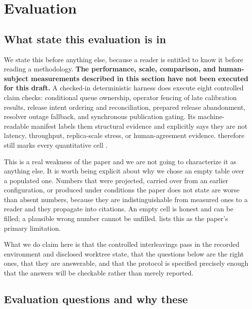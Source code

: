 \section{Evaluation}
\label{sec:eval}



\subsection{What state this evaluation is in}

We state this before anything else, because a reader is entitled to know it before
reading a methodology. \textbf{The performance, scale, comparison, and human-subject
measurements described in this section have not been executed for this draft.}
A checked-in deterministic harness does execute eight controlled claim checks:
conditional queue ownership, operator fencing of late calibration results, release
intent ordering and reconciliation, prepared release abandonment, resolver outage
fallback, and synchronous publication gating.
Its machine-readable manifest labels them structural evidence and explicitly says
they are not latency, throughput, replica-scale stress, or human-agreement evidence.
 therefore still marks every quantitative cell \pending{}.

This is a real weakness of the paper and we are not going to characterize it as
anything else. It is worth being explicit about why we chose an empty table over a
populated one. Numbers that were projected, carried over from an earlier
configuration, or produced under conditions the paper does not state are worse than
absent numbers, because they are indistinguishable from measured ones to a reader
and they propagate into citations. An empty cell is honest and can be filled; a
plausible wrong number cannot be unfilled.  lists this as
the paper's primary limitation.

What we do claim here is that the controlled interleavings pass in the recorded
environment and disclosed worktree state, that the questions below are the right ones, that they are
answerable, and that the protocol is specified precisely enough that the answers
will be checkable rather than merely reported.

\subsection{Evaluation questions and why these}

